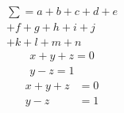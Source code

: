 \documentclass{article}
\begin{document}
\begin{multline}
  \sum = a + b + c + d + e \\
           + f + g + h + i + j \\
           + k + l + m + n
\end{multline}
\begin{gather}
  x + y + z = 0 \\
      y - z = 1
\end{gather}
\begin{align}
  x + y + z &= 0 \\
      y - z &= 1
\end{align}
\end{document}
